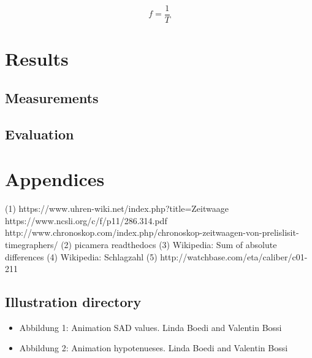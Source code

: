 \documentclass[12pt, a4paper]{report}
\begin{document}
 \begin{displaymath}
  f = \frac{1}{T}
 \end{displaymath}

\chapter{Results}

\section{Measurements}

\section{Evaluation}


\pagebreak

\chapter{Appendices}

\begin{thebibliography}{9}
\bigskip
{} 
(1) https://www.uhren-wiki.net/index.php?title=Zeitwaage
 https://www.ncsli.org/c/f/p11/286.314.pdf
 http://www.chronoskop.com/index.php/chronoskop-zeitwaagen-von-prelislisit-timegraphers/
\bibitem[Picamera]
(2) picamera readthedocs
\bibitem[SAD]
(3) Wikipedia: Sum of absolute differences
\bibitem[Schlagzahl]
(4) Wikipedia: Schlagzahl
(5) http://watchbase.com/eta/caliber/c01-211
\end{thebibliography}

\pagebreak

\section {Illustration directory}
\bigskip

\begin{itemize}
\item Abbildung 1: Animation SAD values. Linda Boedi and Valentin Bossi
\item Abbildung 2: Animation hypotenueses. Linda Boedi and Valentin Bossi
\end{itemize}
\end{document}

